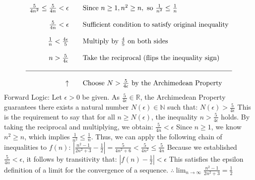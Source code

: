 \documentclass[11pt]{article}
\theoremstyle{plain}
\begin{document}
\begin{minipage}{\textwidth}
\[\begin{array}{rll}
			\frac{5}{4n^2} \leq \frac{5}{4n} < \epsilon                     &  & \text{Since } n \geq 1, n^2 \geq n, \text{ so } \frac{1}{n^2} \leq \frac{1}{n} \\ \\
			\frac{5}{4n} < \epsilon                                         &  & \text{Sufficient condition to satisfy original inequality}                     \\ \\
			\frac{1}{n} < \frac{4\epsilon}{5}                               &  & \text{Multiply by } \frac{4}{5} \text{ on both sides}                          \\ \\
			n > \frac{5}{4\epsilon}                                         &  & \text{Take the reciprocal (flips the inequality sign)}                         \\ \\
			\hline                                                                                                                                              \\
			\uparrow                                                        &  & \text{Choose } N > \frac{5}{4\epsilon} \text{ by the Archimedean Property}
		\end{array}
	\]
	Forward Logic: Let $\epsilon > 0$ be given. As $\frac{5}{4\epsilon} \in \mathbb{R}$, the Archimedean Property guarantees there exists a natural number $N(\epsilon) \in \mathbb{N}$ such that: $N(\epsilon) > \frac{5}{4\epsilon}$
	This is the requirement to say that for all $n \geq N(\epsilon)$, the inequality $n > \frac{5}{4\epsilon}$ holds. By taking the reciprocal and multiplying, we obtain: $\frac{5}{4n} < \epsilon$ Since $n \geq 1$, we know $n^2 \geq n$, which implies $\frac{1}{n^2} \leq \frac{1}{n}$. Thus, we can apply the following chain of inequalities to $f(n)$: $\left| \frac{n^2-1}{2n^2+3} - \frac{1}{2} \right| = \frac{5}{4n^2+6} < \frac{5}{4n^2} \leq \frac{5}{4n}$ Because we established $\frac{5}{4n} < \epsilon$, it follows by transitivity that: $\left| f(n) - \frac{1}{2} \right| < \epsilon$
	This satisfies the epsilon definition of a limit for the convergence of a sequence. $\therefore \lim_{n \to \infty} \frac{n^2-1}{2n^2+3} = \frac{1}{2}$
\end{minipage}
\end{document}
